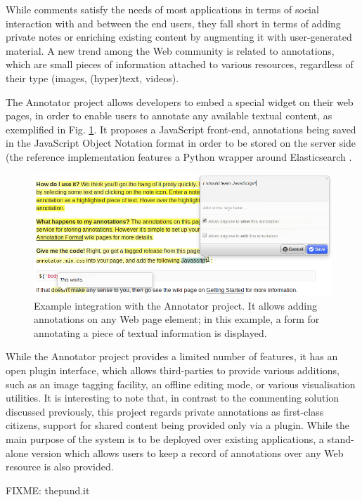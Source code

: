 While comments satisfy the needs of most applications in terms of social
interaction with and between the end users, they fall short in terms of adding
private notes or enriching existing content by augmenting it with
user-generated material. A new trend among the Web community is related to
annotations, which are small pieces of information attached to various
resources, regardless of their type (images, (hyper)text, videos).

The Annotator project \cite{ref:annotator} allows developers to embed a special
widget on their web pages, in order to enable users to annotate any available
textual content, as exemplified in Fig. \ref{fig:annotator}.  It proposes a
JavaScript front-end, annotations being saved in the JavaScript Object Notation
format in order to be stored on the server side (the reference implementation
features a Python wrapper around Elasticsearch \cite{ref:elasearch}.

\begin{figure}[!h]
  \centering
  \includegraphics[scale=0.55]{static/img/annotator.png}
  \caption[Example integration with the Annotator project]
          {Example integration with the Annotator project. It allows
           adding annotations on any Web page element; in this example, a form
           for annotating a piece of textual information is displayed.}
  \label{fig:annotator}
\end{figure}

While the Annotator project provides a limited number of features, it has an
open plugin interface, which allows third-parties to provide various additions,
such as an image tagging facility, an offline editing mode, or various
visualisation utilities. It is interesting to note that, in contrast to the
commenting solution discussed previously, this project regards private
annotations as first-class citizens, support for shared content being provided
only via a plugin. While the main purpose of the system is to be deployed over
existing applications, a stand-alone version which allows users to keep a
record of annotations over any Web resource is also provided.


FIXME: thepund.it
